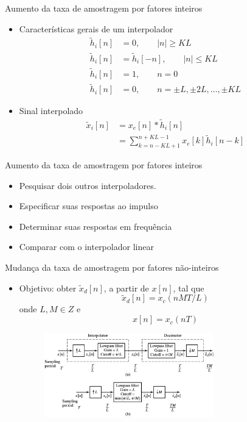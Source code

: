 \documentclass[
size=11pt,
paper=screen,
mode=present,
display=slidesnotes,
style=paintings,
nopagebreaks,
blackslide,
fleqn]{powerdot}
\begin{document}
\begin{slide}{Aumento da taxa de amostragem por fatores inteiros}
	\begin{itemize}
		\item Características gerais de um interpolador
			\begin{align*}
				\tilde h_i[n]&= 0, \qquad |n|\geq KL\\
				\tilde h_i[n]&= \tilde h_i[-n], \qquad |n|\leq KL\\
				\tilde h_i[n]&= 1, \qquad n=0\\
				\tilde h_i[n]&= 0, \qquad n=\pm L, \pm 2L,\dots, \pm KL
			\end{align*}
		\item Sinal interpolado
			\begin{align*}
				\tilde x_i[n] &= x_e[n] * \tilde h_i[n]\\
				              &= \sum_{k= n-KL+1}^{n+KL-1} x_e[k]\tilde h_i[n-k]
			\end{align*}
	\end{itemize}
\end{slide}
\begin{slide}{Aumento da taxa de amostragem por fatores inteiros}
	\begin{itemize}
		\item Pesquisar dois outros interpoladores.
		\item Especificar suas respostas ao impulso
		\item Determinar suas respostas em frequência
		\item Comparar com o interpolador linear
	\end{itemize}
\end{slide}

\begin{slide}{Mudança da taxa de amostragem por fatores não-inteiros}
	\begin{itemize}
		\item Objetivo: obter $\tilde x_d[n]$, a partir de $x[n]$, tal que 
			\begin{equation*}
				\tilde x_d[n] = x_c(nMT/L)
			\end{equation*}
			onde $L, M \in Z$ e 
			\begin{equation*}
				x[n] = x_c(nT)
			\end{equation*}
			\begin{figure}
				\centering
				\includegraphics[width=0.7\textwidth]{figs/4-29.eps}
		        \end{figure}
	\end{itemize}
\end{slide}
\end{document}
